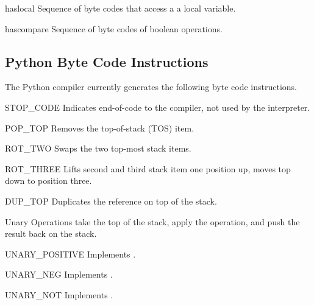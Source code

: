 \begin{datadesc}{haslocal}
Sequence of byte codes that access a a local variable.
\end{datadesc}

\begin{datadesc}{hascompare}
Sequence of byte codes of boolean operations.
\end{datadesc}

\subsection{Python Byte Code Instructions}

The Python compiler currently generates the following byte code
instructions.

\renewcommand{\indexsubitem}{(byte code insns)}

\begin{opcodedesc}{STOP_CODE}{}
Indicates end-of-code to the compiler, not used by the interpreter.
\end{opcodedesc}

\begin{opcodedesc}{POP_TOP}{}
Removes the top-of-stack (TOS) item.
\end{opcodedesc}

\begin{opcodedesc}{ROT_TWO}{}
Swaps the two top-most stack items.
\end{opcodedesc}

\begin{opcodedesc}{ROT_THREE}{}
Lifts second and third stack item one position up, moves top down
to position three.
\end{opcodedesc}

\begin{opcodedesc}{DUP_TOP}{}
Duplicates the reference on top of the stack.
\end{opcodedesc}

Unary Operations take the top of the stack, apply the operation, and
push the result back on the stack.

\begin{opcodedesc}{UNARY_POSITIVE}{}
Implements .
\end{opcodedesc}

\begin{opcodedesc}{UNARY_NEG}{}
Implements .
\end{opcodedesc}

\begin{opcodedesc}{UNARY_NOT}{}
Implements .
\end{opcodedesc}

